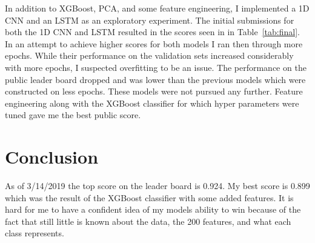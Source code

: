 \documentclass[11pt,letterpaper]{article}
\begin{document}
\begin{table}[h!]
\centering
\caption{Final public results}
\label{tab:final}
\end{table}

In addition to XGBoost, PCA, and some feature engineering, I implemented a 1D CNN
and an LSTM as an exploratory experiment.  The initial submissions for both the
1D CNN and LSTM resulted in the scores seen in in Table~\ref{tab:final}.  In an
attempt to achieve higher scores for both models I ran then through more epochs.
While their performance on the validation sets increased considerably with more
epochs, I suspected overfitting to be an issue.  The performance on the public
leader board dropped and was lower than the previous models which were
constructed on less epochs.  These models were not pursued any further.  Feature
engineering along with the XGBoost classifier for which hyper parameters were
tuned gave me the best public score.

\section{Conclusion}

As of 3/14/2019 the top score on the leader board is 0.924.  My best score is
0.899 which was the result of the XGBoost classifier with some added features.
It is hard for me to have a confident idea of my models ability to win because
of the fact that still little is known about the data, the 200 features, and
what each class represents.%
\end{document}
